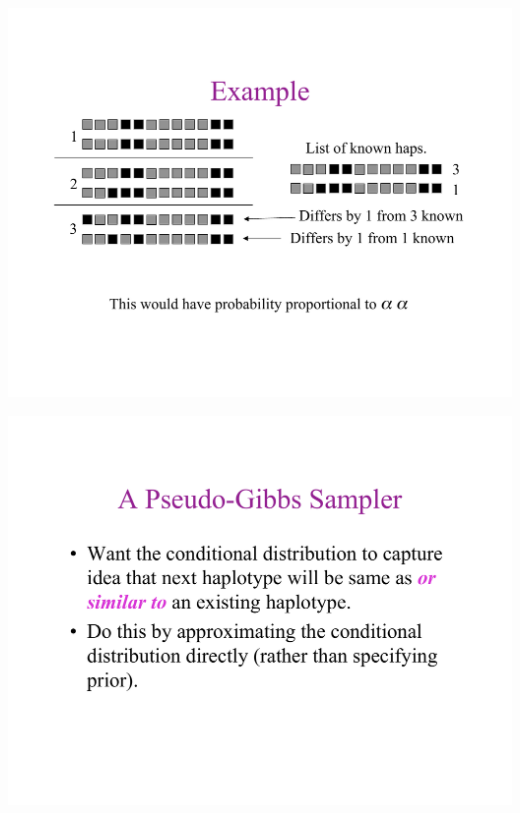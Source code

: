 \newslide{}
\mbox{}
\vspace*{\VertUp}
\enlargethispage*{1000pt}
\begin{center}
\includegraphics*[width=\textwidth]{PPT_pages/pg_0041.pdf}
\end{center}


\newslide{}
\mbox{}
\vspace*{\VertUp}
\enlargethispage*{1000pt}
\begin{center}
\includegraphics*[width=\textwidth]{PPT_pages/pg_0042.pdf}
\end{center}



